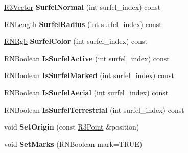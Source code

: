 \begin{DoxyCompactItemize}
\item 
\hyperlink{class_r3_vector}{R3\+Vector} {\bfseries Surfel\+Normal} (int surfel\+\_\+index) const \hypertarget{class_r3_surfel_block_aab40d9d3b578050f3c82bda7b578f250}{}\label{class_r3_surfel_block_aab40d9d3b578050f3c82bda7b578f250}

\item 
R\+N\+Length {\bfseries Surfel\+Radius} (int surfel\+\_\+index) const \hypertarget{class_r3_surfel_block_a1204c80f3b661cd34fcc8e767816a4f2}{}\label{class_r3_surfel_block_a1204c80f3b661cd34fcc8e767816a4f2}

\item 
\hyperlink{class_r_n_rgb}{R\+N\+Rgb} {\bfseries Surfel\+Color} (int surfel\+\_\+index) const \hypertarget{class_r3_surfel_block_a521258ac353eb0cddce79ef66ce5c7cc}{}\label{class_r3_surfel_block_a521258ac353eb0cddce79ef66ce5c7cc}

\item 
R\+N\+Boolean {\bfseries Is\+Surfel\+Active} (int surfel\+\_\+index) const \hypertarget{class_r3_surfel_block_aa2b190b6eee57a0f42c05c9da0428545}{}\label{class_r3_surfel_block_aa2b190b6eee57a0f42c05c9da0428545}

\item 
R\+N\+Boolean {\bfseries Is\+Surfel\+Marked} (int surfel\+\_\+index) const \hypertarget{class_r3_surfel_block_a06760bf48aa797f09f1ae62315d835f4}{}\label{class_r3_surfel_block_a06760bf48aa797f09f1ae62315d835f4}

\item 
R\+N\+Boolean {\bfseries Is\+Surfel\+Aerial} (int surfel\+\_\+index) const \hypertarget{class_r3_surfel_block_ac46e7a6e721f89b58b67236589c5b95e}{}\label{class_r3_surfel_block_ac46e7a6e721f89b58b67236589c5b95e}

\item 
R\+N\+Boolean {\bfseries Is\+Surfel\+Terrestrial} (int surfel\+\_\+index) const \hypertarget{class_r3_surfel_block_afa59a82c610bc5bfff416ed38d3a4d48}{}\label{class_r3_surfel_block_afa59a82c610bc5bfff416ed38d3a4d48}

\item 
void {\bfseries Set\+Origin} (const \hyperlink{class_r3_point}{R3\+Point} \&position)\hypertarget{class_r3_surfel_block_aee626ec4989522515de21f6e44f659ca}{}\label{class_r3_surfel_block_aee626ec4989522515de21f6e44f659ca}

\item 
void {\bfseries Set\+Marks} (R\+N\+Boolean mark=T\+R\+UE)\hypertarget{class_r3_surfel_block_ab4948fd628b685a9244116f99b20a15c}{}\label{class_r3_surfel_block_ab4948fd628b685a9244116f99b20a15c}


\end{DoxyCompactItemize}
